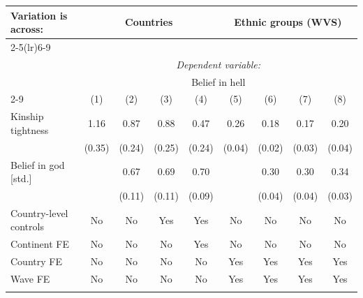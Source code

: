 {\begin{tabular}{l*{8}{c}}\toprule\toprule Variation is across:& \multicolumn{4}{c}{Countries} &\multicolumn{4}{c}{Ethnic groups (WVS)}\\\cmidrule(lr){2-5}\cmidrule(lr){6-9}\\ &\multicolumn{8}{c}{\textit{Dependent variable:}}\\ &\multicolumn{8}{c}{Belief in hell}\\\cmidrule(lr){2-9}
                &\multicolumn{1}{c}{(1)}         &\multicolumn{1}{c}{(2)}         &\multicolumn{1}{c}{(3)}         &\multicolumn{1}{c}{(4)}         &\multicolumn{1}{c}{(5)}         &\multicolumn{1}{c}{(6)}         &\multicolumn{1}{c}{(7)}         &\multicolumn{1}{c}{(8)}         \\
\midrule
Kinship tightness $\qquad$&     1.16\sym{***}&     0.87\sym{***}&     0.88\sym{***}&     0.47\sym{**} &     0.26\sym{***}&     0.18\sym{***}&     0.17\sym{***}&     0.20\sym{***}\\
                &   (0.35)         &   (0.24)         &   (0.25)         &   (0.24)         &   (0.04)         &   (0.02)         &   (0.03)         &   (0.04)         \\
\addlinespace
Belief in god [std.]&                  &     0.67\sym{***}&     0.69\sym{***}&     0.70\sym{***}&                  &     0.30\sym{***}&     0.30\sym{***}&     0.34\sym{***}\\
                &                  &   (0.11)         &   (0.11)         &   (0.09)         &                  &   (0.04)         &   (0.04)         &   (0.03)         \\
\addlinespace
Country-level controls&       No         &       No         &      Yes         &      Yes         &       No         &       No         &       No         &       No         \\
\addlinespace
Continent FE    &       No         &       No         &       No         &      Yes         &       No         &       No         &       No         &       No         \\
\addlinespace
Country FE      &       No         &       No         &       No         &       No         &      Yes         &      Yes         &      Yes         &      Yes         \\
\addlinespace
Wave FE         &       No         &       No         &       No         &       No         &      Yes         &      Yes         &      Yes         &      Yes         \\
\addlinespace

\end{tabular}}
